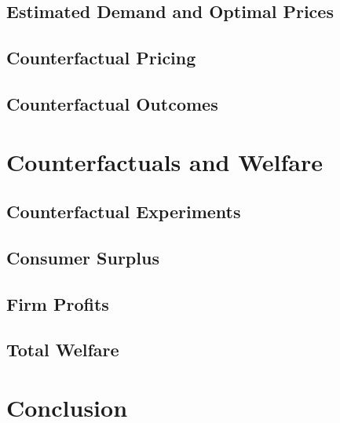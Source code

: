 \documentclass[12pt]{article}
\theoremstyle{definition}
\theoremstyle{remark}
\begin{document}
\subsection{Estimated Demand and Optimal Prices}

\subsection{Counterfactual Pricing}

\subsection{Counterfactual Outcomes}



\section{Counterfactuals and Welfare}
\label{sec:counterfactuals}

\subsection{Counterfactual Experiments}

\subsection{Consumer Surplus}

\subsection{Firm Profits}

\subsection{Total Welfare}



\section{Conclusion}
\label{sec:conclusion}


\end{document}
